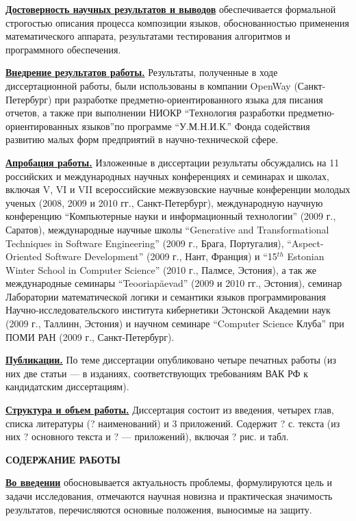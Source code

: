 \documentclass[12pt,a4paper]{article}
\theoremstyle{definition}
\theoremstyle{plain}
\newcommand{\afsection}[1]{\par \begin{center}\textbf{\MakeUppercase{#1}}\end{center}}
\newcommand{\afsubsection}[1]{\par \textbf{\underline{#1}}}
\begin{document}
\afsubsection{Достоверность научных результатов и выводов} обеспечивается формальной строгостью описания процесса композиции языков, обоснованностью применения математического аппарата, результатами тестирования алгоритмов и программного обеспечения.

\afsubsection{Внедрение результатов работы.} Результаты, полученные в ходе диссертационной работы, были использованы в компании OpenWay (Санкт-Петербург) при разработке предметно-ориентированного языка для писания отчетов, а также при выполнении НИОКР ``Технология разработки предметно-ориентированных языков''по программе ``У.М.Н.И.К.'' Фонда содействия развитию малых форм предприятий в научно-технической сфере.

\afsubsection{Апробация работы.} Изложенные в диссертации результаты обсуждались на 11 российских и международных научных конференциях и семинарах и школах, включая V, VI и VII всероссийские межвузовские научные конференции молодых ученых (2008, 2009 и 2010 гг., Санкт-Петербург), международную научную конференцию ``Компьютерные науки и информационный технологии'' (2009 г., Саратов), международные научные школы ``Generative and Transformational Techniques in Software Engineering'' (2009 г., Брага, Португалия), ``Aspect-Oriented Software Development'' (2009 г., Нант, Франция) и ``15$^{th}$ Estonian Winter School in Computer Science'' (2010 г., Палмсе, Эстония), а так же международные семинары ``Teooriapäevad'' (2009 и 2010 гг., Эстония), семинар Лаборатории математической логики и семантики языков программирования Научно-исследовательского института кибернетики Эстонской Академии наук (2009 г., Таллинн, Эстония) и научном семинаре ``Computer Science Клуба'' при ПОМИ РАН (2009 г., Санкт-Петербург).

\afsubsection{Публикации.} По теме диссертации опубликовано четыре печатных работы (из них две статьи --- в изданиях, соответствующих требованиям ВАК РФ к кандидатским диссертациям).

\afsubsection{Структура и объем работы.} Диссертация состоит из введения, четырех глав, списка литературы (? наименований) и 3 приложений. Содержит ? с. текста (из них ? основного текста и ? --- приложений), включая ? рис. и табл.

\newpage
\afsection{Содержание работы}

\afsubsection{Во введении} обосновывается актуальность проблемы, формулируются цель и задачи исследования, отмечаются научная новизна и практическая значимость результатов, перечисляются основные положения, выносимые на защиту.
\end{document}
